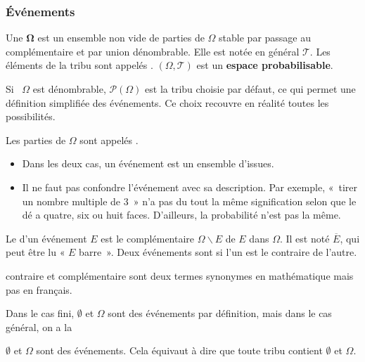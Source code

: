 \subsubsection{Événements}
\begin{definition}
Une \(𝛀\) est un ensemble non vide de parties de \(Ω\) stable par
passage au complémentaire et par union dénombrable. Elle est notée en général \(𝒯\). Les éléments de
la tribu sont appelés . \((Ω,𝒯)\) est un \textbf{espace
probabilisable}.
\end{definition}
\begin{remark}
Si \ \(Ω\) est dénombrable, \(𝒫(Ω)\) est la tribu choisie par défaut, ce
qui permet une définition simplifiée des événements. Ce choix recouvre en réalité toutes les possibilités.
\end{remark}
\begin{definition}
Les parties de \(Ω\) sont appelés .
\end{definition}
\begin{remark}
\vspace*{-\baselineskip}
\begin{itemize}
\item
Dans les deux cas, un événement est un ensemble d'issues.
\item
Il ne faut pas confondre l'événement avec sa description. Par exemple, «~tirer un nombre multiple
de 3~» n'a pas du tout la même signification selon que le dé a quatre, six ou huit faces. D'ailleurs, la probabilité
n'est pas la même.
\end{itemize}
\end{remark}
\begin{definition}
Le  d'un événement \(𝐸\) est le complémentaire \(Ω∖ 𝐸\) de \(𝐸\) dans
\(Ω\). Il est noté \(\overline{𝐸}\), qui peut être lu « \(𝐸\) barre~». Deux événements sont
 si l'un est le contraire de l'autre.
\end{definition}
\begin{remark}
contraire et complémentaire sont deux termes synonymes en mathématique mais pas en
français.
\end{remark}
Dans le cas fini, \(∅\) et \(Ω\) sont des événements par définition, mais dans le cas
général, on a la
\begin{proposition}
\(∅\) et \(Ω\) sont des événements.
Cela équivaut à dire que toute tribu contient \(∅\) et \(Ω\).
\end{proposition}
